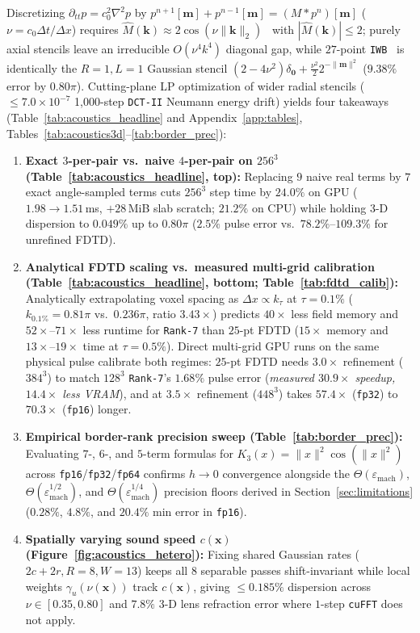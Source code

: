 \documentclass[11pt,a4paper]{article}
\theoremstyle{plain}
\theoremstyle{definition}
\begin{document}
Discretizing $\partial_{tt} p = c_0^2 \nabla^2 p$ by $p^{n+1}[\mathbf{m}] + p^{n-1}[\mathbf{m}] = (M * p^n)[\mathbf{m}]$ ($\nu = c_0\Delta t/\Delta x$) requires $\widehat{M}(\mathbf{k}) \approx 2\cos(\nu\|\mathbf{k}\|_2)$~\cite{tabei2002kspace} with $|\widehat{M}(\mathbf{k})| \le 2$; purely axial stencils leave an irreducible $O(\nu^4 k^4)$ diagonal gap, while $27$-point \texttt{IWB}~\cite{kowalczyk2011room} is identically the $R = 1, L = 1$ Gaussian stencil $(2 - 4\nu^2)\delta_{\mathbf{0}} + \frac{\nu^2}{2} 2^{-\|\mathbf{m}\|^2}$ ($9.38\%$ error by $0.80\pi$). Cutting-plane LP optimization of wider radial stencils ($\le 7.0 \times 10^{-7}$ 1,000-step \texttt{DCT-II} Neumann energy drift) yields four takeaways (Table~\ref{tab:acoustics_headline} and Appendix~\ref{app:tables}, Tables~\ref{tab:acoustics3d}--\ref{tab:border_prec}):
\begin{enumerate}[leftmargin=2em,itemsep=2pt]
  \item \textbf{Exact $3$-per-pair vs.\ naive $4$-per-pair on $256^3$ (Table~\ref{tab:acoustics_headline}, top):} Replacing $9$ naive real terms by $7$ exact angle-sampled terms cuts $256^3$ step time by $24.0\%$ on GPU ($1.98 \to 1.51$\,ms, $+28$\,MiB slab scratch; $21.2\%$ on CPU) while holding 3-D dispersion to $0.049\%$ up to $0.80\pi$ ($2.5\%$ pulse error vs.\ $78.2\%\text{--}109.3\%$ for unrefined FDTD).
  \item \textbf{Analytical FDTD scaling vs.\ measured multi-grid calibration (Table~\ref{tab:acoustics_headline}, bottom; Table~\ref{tab:fdtd_calib}):} Analytically extrapolating voxel spacing as $\Delta x \propto k_\tau$ at $\tau = 0.1\%$ ($k_{0.1\%} = 0.81\pi$ vs.\ $0.236\pi$, ratio $3.43\times$) predicts $40\times$ less field memory and $52\times\text{--}71\times$ less runtime for \texttt{Rank-7} than $25$-pt FDTD ($15\times$ memory and $13\times\text{--}19\times$ time at $\tau = 0.5\%$). Direct multi-grid GPU runs on the same physical pulse calibrate both regimes: $25$-pt FDTD needs $3.0\times$ refinement ($384^3$) to match $128^3$ \texttt{Rank-7}'s $1.68\%$ pulse error (\emph{measured $30.9\times$ speedup, $14.4\times$ less VRAM}), and at $3.5\times$ refinement ($448^3$) takes $57.4\times$ (\texttt{fp32}) to $70.3\times$ (\texttt{fp16}) longer.
  \item \textbf{Empirical border-rank precision sweep (Table~\ref{tab:border_prec}):} Evaluating $7$-, $6$-, and $5$-term formulas for $K_3(x) = \|x\|^2\cos(\|x\|^2)$ across \texttt{fp16}/\texttt{fp32}/\texttt{fp64} confirms $h \to 0$ convergence alongside the $\Theta(\varepsilon_{\mathrm{mach}})$, $\Theta(\varepsilon_{\mathrm{mach}}^{1/2})$, and $\Theta(\varepsilon_{\mathrm{mach}}^{1/4})$ precision floors derived in Section~\ref{sec:limitations} ($0.28\%$, $4.8\%$, and $20.4\%$ min error in \texttt{fp16}).
  \item \textbf{Spatially varying sound speed $c(\mathbf{x})$ (Figure~\ref{fig:acoustics_hetero}):} Fixing shared Gaussian rates ($2c + 2r, R = 8, W = 13$) keeps all $8$ separable passes shift-invariant while local weights $\gamma_u(\nu(\mathbf{x}))$ track $c(\mathbf{x})$, giving $\le 0.185\%$ dispersion across $\nu \in [0.35, 0.80]$ and $7.8\%$ 3-D lens refraction error where $1$-step \texttt{cuFFT} does not apply.
\end{enumerate}
\end{document}
